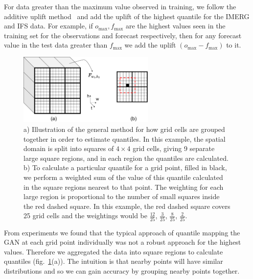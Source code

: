 \documentclass{article}
\begin{document}

For data greater than the maximum value observed in training, we follow the additive uplift method~\citep{boe_statistical_2007, deque_frequency_2007} and add the uplift of the highest quantile for the IMERG and IFS data. For example, if $o_{\text{max}},f_{\text{max}}$ are the highest values seen in the training set for the observations and forecast respectively, then for any forecast value in the test data greater than $f_{\text{max}}$ we add the uplift $(o_{\text{max}} - f_{\text{max}})$ to it. 

\begin{figure}

    \centering

        \includegraphics[width=0.6\textwidth]{images/quantile_mapping.drawio.pdf}
      \caption{a) Illustration of the general method for how grid cells are grouped together in order to estimate quantiles. In this example, the spatial domain is split into squares of $4 \times 4$ grid cells, giving 9 separate large square regions, and in each region the quantiles are calculated. b) To calculate a particular quantile for a grid point, filled in black, we perform a weighted sum of the value of this quantile calculated in the square regions nearest to that point. The weighting for each large region is proportional to the number of small squares inside the red dashed square. In this example, the red dashed square covers 25 grid cells and the weightings would be $\frac{12}{25}$, $\frac{3}{25}$, $\frac{8}{25}$, $\frac{2}{25}$.}
     \label{fig:quantiles}
\end{figure}    

From experiments we found that the typical approach of quantile mapping the GAN at each grid point individually was not a robust approach for the highest values. Therefore we aggregated the data into square regions to calculate quantiles (fig.~\ref{fig:quantiles}(a)). The intuition is that nearby points will have similar distributions and so we can gain accuracy by grouping nearby points together. 
\end{document}
